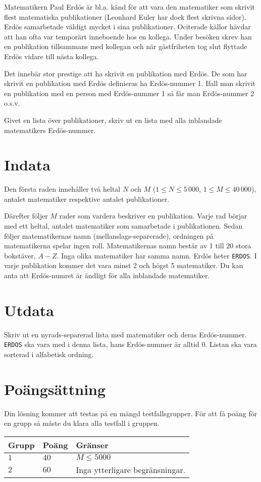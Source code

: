 
Matematikern Paul Erdös är bl.a. känd för att vara den matematiker som skrivit flest matematiska publikationer
(Leonhard Euler har dock flest skrivna sidor). Erdös samarbetade väldigt mycket i sina publikationer. Ociterade
källor hävdar att han ofta var temporärt inneboende hos en kollega. Under besöken skrev han en publikation
tillsammans med kollegan och när gästfriheten tog slut flyttade Erdös vidare till nästa kollega.

Det innebär stor prestige att ha skrivit en publikation med Erdös. De som har skrivit en publikation med Erdös
definieras ha Erdös-nummer 1. Ifall man skrivit en publikation med en person med Erdös-nummer 1 så får man Erdös-nummer 2 o.s.v.

Givet en lista över publikationer, skriv ut en lista med alla inblandade matematikers Erdös-nummer.

\section{Indata}
Den första raden innehåller två heltal $N$ och $M$ ($1 \le N \le 5\,000$, $1 \le M \le 40\,000$), antalet
matematiker respektive antalet publikationer.

Därefter följer $M$ rader som vardera beskriver en publikation. Varje rad börjar med ett heltal,
antalet matematiker som samarbetade i publikationen. Sedan följer matematikernas namn (mellanslags-separerade),
ordningen på matematikerna spelar ingen roll. Matematikernas namn består av 1 till 20 stora bokstäver, $A - Z$.
Inga olika matematiker har samma namn. Erdös heter \texttt{ERDOS}. I varje publikation kommer det vara minst 2
och högst 5 matematiker. Du kan anta att Erdös-numret är ändligt för alla inblandade matematiker.

\section{Utdata}
Skriv ut en nyrads-separerad lista med matematiker och deras Erdös-nummer. \texttt{ERDOS} ska vara med i denna
lista, hans Erdös-nummer är alltid 0. Listan ska vara sorterad i alfabetisk ordning. 


\section*{Poängsättning}
Din lösning kommer att testas på en mängd testfallsgrupper.
För att få poäng för en grupp så måste du klara alla testfall i gruppen.

\noindent
\begin{tabular}{| l | l | p{12cm} |}
  \hline
  \textbf{Grupp} & \textbf{Poäng} & \textbf{Gränser} \\ \hline
  $1$    & $40$          & $M \leq 5000$  \\ \hline
  $2$    & $60$          & Inga ytterligare begränsningar.  \\ \hline
\end{tabular}
